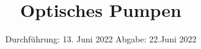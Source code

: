 

\subject{V21}
\title{Optisches Pumpen}
\date{%
  Durchführung: 13. Juni 2022
  \hspace{3em}
  Abgabe: 22.Juni 2022
}



\maketitle
\thispagestyle{empty}
\tableofcontents
\newpage

%






\printbibliography{}



